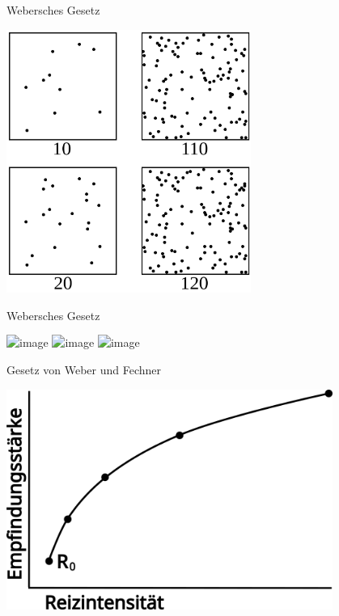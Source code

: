 \documentclass[aspectratio=169]{beamer}
\begin{document}
\begin{frame}{Webersches Gesetz}
\begin{center}
    \includegraphics[width=0.6\textwidth]{Weber-Fechner_law_demo_-_dots.svg.png}
\end{center}
\end{frame}


\begin{frame}{Webersches Gesetz}

\begin{center}
    \includegraphics<1>[width=0.8\textwidth]{weber_fechner_1.png}
    \includegraphics<2>[width=0.8\textwidth]{weber_fechner_2.png}
    \includegraphics<3>[width=0.8\textwidth]{weber_fechner_3.png}
\end{center}
    
\end{frame}


\begin{frame}{Gesetz von Weber und Fechner}

\begin{center}
    \includegraphics[width=0.8\textwidth]{weber_fechner.png}
\end{center}
    


\end{frame}
\end{document}

